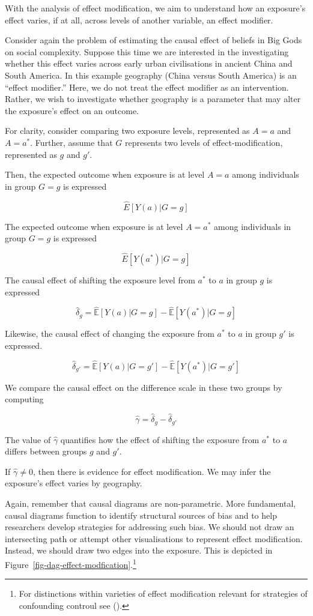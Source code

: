 \documentclass[
  singlecolumn,
  9pt]{article}
\begin{document}
With the analysis of effect modification, we aim to understand how an
exposure's effect varies, if at all, across levels of another variable,
an effect modifier.

Consider again the problem of estimating the causal effect of beliefs in
Big Gods on social complexity. Suppose this time we are interested in
the investigating whether this effect varies across early urban
civilisations in ancient China and South America. In this example
geography (China versus South America) is an ``effect modifier.'' Here,
we do not treat the effect modifier as an intervention. Rather, we wish
to investigate whether geography is a parameter that may alter the
exposure's effect on an outcome.

For clarity, consider comparing two exposure levels, represented as
\(A = a\) and \(A= a^*\). Further, assume that \(G\) represents two
levels of effect-modification, represented as \(g\) and \(g'\).

Then, the expected outcome when exposure is at level \(A=a\) among
individuals in group \(G=g\) is expressed

\[\hat{E}[Y(a)|G=g]\]

The expected outcome when exposure is at level \(A=a^*\) among
individuals in group \(G=g\) is expressed

\[\hat{E}[Y(a^*)|G=g]\]

The causal effect of shifting the exposure level from \(a^*\) to \(a\)
in group \(g\) is expressed

\[\hat{\delta}_g = \hat{\mathbb{E}}[Y(a)|G=g] - \hat{\mathbb{E}}[Y(a^*)|G=g]\]

Likewise, the causal effect of changing the exposure from \(a^*\) to
\(a\) in group \(g'\) is expressed.

\[\hat{\delta}_{g'} = \hat{\mathbb{E}}[Y(a)|G=g'] - \hat{\mathbb{E}}[Y(a^*)|G=g']\]

We compare the causal effect on the difference scale in these two groups
by computing

\[\hat{\gamma} = \hat{\delta}_g - \hat{\delta}_{g'}\]

The value of \(\hat{\gamma}\) quantifies how the effect of shifting the
exposure from \(a^*\) to \(a\) differs between groups \(g\) and \(g'\).

If \(\hat{\gamma}\neq 0\), then there is evidence for effect
modification. We may infer the exposure's effect varies by geography.

Again, remember that causal diagrams are non-parametric. More
fundamental, causal diagrams function to identify structural sources of
bias and to help researchers develop strategies for addressing such
bias. We should not draw an intersecting path or attempt other
visualisations to represent effect modification. Instead, we should draw
two edges into the exposure. This is depicted in
Figure~\ref{fig-dag-effect-modfication}.\footnote{For distinctions
  within varieties of effect modification relevant for strategies of
  confounding controul see ().}
\end{document}
